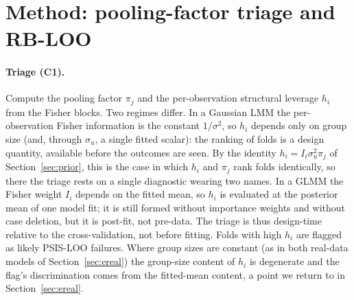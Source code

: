 \documentclass[11pt]{article}
\begin{document}
\section{Method: pooling-factor triage and RB-LOO}\label{sec:method}

\paragraph{Triage (C1).} Compute the pooling factor $\pi_j$ and the
per-observation structural leverage $h_i$ from the Fisher blocks. Two regimes
differ. In a Gaussian LMM the per-observation Fisher information is the constant
$1/\sigma^2$, so $h_i$ depends only on group size (and, through $\sigma_u$, a single
fitted scalar): the ranking of folds is a design quantity, available before the
outcomes are seen. By the identity $h_i = I_i\sigma_u^2\pi_j$ of
Section~\ref{sec:prior}, this is the case in which $h_i$ and $\pi_j$ rank
folds identically, so there the triage rests on a single diagnostic wearing two
names. In a GLMM the Fisher weight $I_i$ depends on the fitted mean, so
$h_i$ is evaluated at the posterior mean of one model fit; it is still formed
without importance weights and without case deletion, but it is post-fit, not
pre-data. The triage is thus design-time relative to the cross-validation, not
before fitting. Folds with high $h_i$ are flagged as likely PSIS-LOO failures. Where
group sizes are constant (as in both real-data models of Section~\ref{sec:ereal})
the group-size content of $h_i$ is degenerate and the flag's discrimination comes
from the fitted-mean content, a point we return to in Section~\ref{sec:ereal}.
\end{document}
